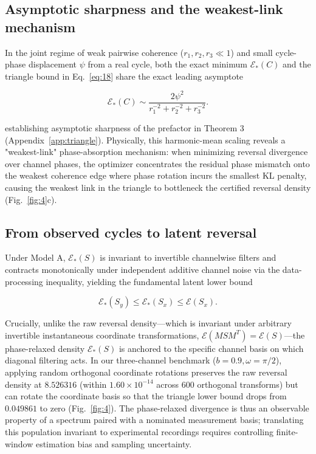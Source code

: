 \documentclass[aps,pre,reprint,amsmath,amssymb,superscriptaddress]{revtex4-2}
\begin{document}
\subsection{Asymptotic sharpness and the weakest-link mechanism}

In the joint regime of weak pairwise coherence ($r_1, r_2, r_3 \ll 1$) and small cycle-phase displacement $\psi$ from a real cycle, both the exact minimum $\mathcal{E}_*(C)$ and the triangle bound in Eq.~\eqref{eq:18} share the exact leading asymptote

\begin{equation}\label{eq:19}
\boxed{
\mathcal E_*(C)
\sim
\frac{
2\psi^2
}{
r_1^{-2}+r_2^{-2}+r_3^{-2}
}.
}
\end{equation}



establishing asymptotic sharpness of the prefactor in Theorem 3 (Appendix~\ref{app:triangle}). Physically, this harmonic-mean scaling reveals a "weakest-link" phase-absorption mechanism: when minimizing reversal divergence over channel phases, the optimizer concentrates the residual phase mismatch onto the weakest coherence edge where phase rotation incurs the smallest KL penalty, causing the weakest link in the triangle to bottleneck the certified reversal density (Fig.~\ref{fig:4}c).

\subsection{From observed cycles to latent reversal}

Under Model A, $\mathcal{E}_*(S)$ is invariant to invertible channelwise filters and contracts monotonically under independent additive channel noise via the data-processing inequality, yielding the fundamental latent lower bound

\begin{equation}\label{eq:20}
\boxed{
\mathcal E_*(S_y)
\le
\mathcal E_*(S_x)
\le
\mathcal E(S_x).
}
\end{equation}




Crucially, unlike the raw reversal density---which is invariant under arbitrary invertible instantaneous coordinate transformations, $\mathcal{E}(M S M^T) = \mathcal{E}(S)$---the phase-relaxed density $\mathcal{E}_*(S)$ is anchored to the specific channel basis on which diagonal filtering acts. In our three-channel benchmark ($b = 0.9, \omega = \pi/2$), applying random orthogonal coordinate rotations preserves the raw reversal density at $8.526316$ (within $1.60 \times 10^{-14}$ across $600$ orthogonal transforms) but can rotate the coordinate basis so that the triangle lower bound drops from $0.049861$ to zero (Fig.~\ref{fig:4}). The phase-relaxed divergence is thus an observable property of a spectrum paired with a nominated measurement basis; translating this population invariant to experimental recordings requires controlling finite-window estimation bias and sampling uncertainty.
\end{document}
